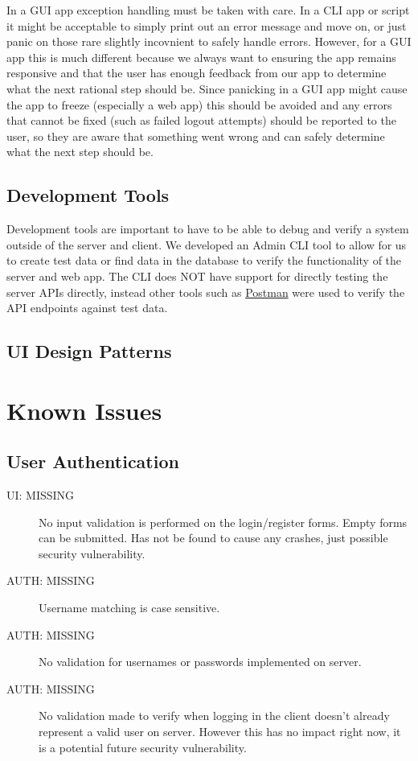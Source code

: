 \documentclass{article}
\begin{document}
In a GUI app exception handling must be taken with care.
In a CLI app or script it might be acceptable to simply print out an error message and move on, or just panic on those rare slightly incovnient to safely handle errors.
However, for a GUI app this is much different because we always want to ensuring the app remains responsive and that the user has enough feedback from our app to determine what the next rational step should be.
Since panicking in a GUI app might cause the app to freeze (especially a web app) this should be avoided and any errors that cannot be fixed (such as failed logout attempts) should be reported to the user, so they are aware that something went wrong and can safely determine what the next step should be. 

\subsection{Development Tools}

Development tools are important to have to be able to debug and verify a system outside of the server and client.  We developed an Admin CLI tool to allow for us to create test data or find data in the database to verify the functionality of the server and web app.
The CLI does NOT have support for directly testing the server APIs directly, instead other tools such as \href{https://www.postman.com}{Postman} were used to verify the API endpoints against test data.

\subsection{UI Design Patterns}

\section{Known Issues}

\subsection{User Authentication}

\begin{description}
  \item[UI: MISSING] No input validation is performed on the login/register forms.  Empty forms can be submitted.  Has not be found to cause any crashes, just possible security vulnerability.
  \item[AUTH: MISSING] Username matching is case sensitive.
  \item[AUTH: MISSING] No validation for usernames or passwords implemented on server.
  \item[AUTH: MISSING] No validation made to verify when logging in the client doesn't already represent a valid user on server.  However this has no impact right now, it is a potential future security vulnerability.  
\end{description}
\end{document}
